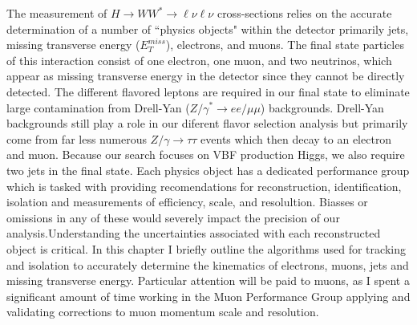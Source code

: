 The measurement of $H\rightarrow WW^*\rightarrow \ell\nu\ell\nu$ cross-sections relies on the accurate determination of a number of ``physics objects" within the detector primarily jets, missing transverse energy ($E_T^{miss}$), electrons, and muons. The final state particles of this interaction consist of one electron, one muon, and two neutrinos, which appear as missing transverse energy in the detector since they cannot be directly detected. The different flavored leptons are required in our final state to eliminate large contamination from Drell-Yan ($Z/\gamma^*\rightarrow ee/\mu\mu$) backgrounds. Drell-Yan backgrounds still play a role in our diferent flavor selection analysis but primarily come from far less numerous $Z/\gamma\rightarrow\tau\tau$ events which then decay to an electron and muon. Because our search focuses on VBF production Higgs, we also require two jets in the final state. Each physics object has a dedicated performance group which is tasked with providing recomendations for reconstruction, identification, isolation and measurements of efficiency, scale, and resolultion. Biasses or omissions in any of these would severely impact the precision of our analysis.Understanding the uncertainties associated with each reconstructed object is critical. In this chapter I briefly outline the algorithms used for tracking and isolation to accurately determine the kinematics of electrons, muons, jets and missing transverse energy. Particular attention will be paid to muons, as I spent a significant amount of time working in the Muon Performance Group applying and validating corrections to muon momentum scale and resolution. 

